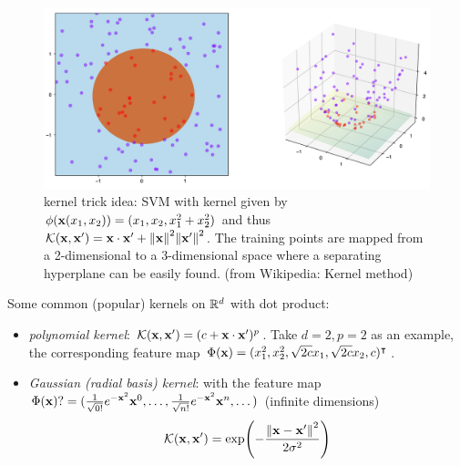 \begin{figure}[!ht]
	\centering
	\includegraphics[width=0.6\linewidth]{Kernel_trick_idea.png}
	\caption{kernel trick idea: SVM with kernel given by $\phi(\vb{x}(x_1, x_2)) = (x_1, x_2, x_1^2 + x_2^2)$ and thus $\mathcal{K}(\vb{x},\vb{x}')=\vb{x}\cdot \vb{x}' + \norm{\vb{x}}^2 \norm{\vb{x}'}^2$. The training points are mapped from a 2-dimensional to a 3-dimensional space where a separating hyperplane can be easily found. (from Wikipedia: Kernel method)}
	\label{fig:kernel}
\end{figure}
Some common (popular) kernels on $\mathbb{R}^d$ with dot product:
\begin{itemize}
	\item \emph{polynomial kernel}:
	$\mathcal{K}(\vb{x},\vb{x}')=(c+\vb{x}\cdot \vb{x}')^p$.
	Take $d=2,p=2$ as an example, the corresponding feature map $\Phi(\vb{x})=(x_1^2,x_2^2,\sqrt{2c}x_1,\sqrt{2c}x_2,c)^\intercal$.

	\item \emph{Gaussian (radial basis) kernel}:
	with the feature map $\Phi(\vb{x})?=(\frac{1}{\sqrt{0!}}e^{-\vb{x}^2}\vb{x}^0,\dots,\frac{1}{\sqrt{n!}}e^{-\vb{x}^2}\vb{x}^n,\dots)$ (infinite dimensions)
	\begin{equation}
		\mathcal{K}(\vb{x},\vb{x}') = 
		\exp(-\frac{\norm{\vb{x}-\vb{x}'}^2}{2\sigma^2})
		\label{eq:gaussian_kernel}
	\end{equation}
\end{itemize}
